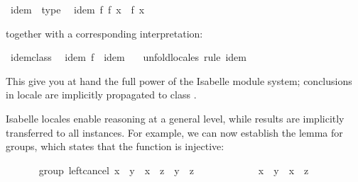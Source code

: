\begin{isabellebody}
\begin{isamarkuptext}
\end{isamarkuptext}%
\isamarkuptrue%
\isamarkupfalse%
\ idem\ {\isacharless}\ type\isanewline
\ \ idem{\isacharcolon}\ {\isachardoublequoteopen}f\ {\isacharparenleft}f\ x{\isacharparenright}\ {\isacharequal}\ f\ x{\isachardoublequoteclose}%
\begin{isamarkuptext}%
\noindent together with a corresponding interpretation:%
\end{isamarkuptext}%
\isamarkuptrue%
\isamarkupfalse%
\ idem{\isacharunderscore}class{\isacharcolon}\isanewline
\ \ idem\ {\isacharbrackleft}{\isachardoublequoteopen}f\ {\isasymColon}\ {\isacharparenleft}{\isasymalpha}{\isasymColon}idem{\isacharparenright}\ {\isasymRightarrow}\ {\isasymalpha}{\isachardoublequoteclose}{\isacharbrackright}\isanewline
%
\isadelimproof
%
\endisadelimproof
%
\isatagproof
{}\isamarkupfalse%
\ unfold{\isacharunderscore}locales\ {\isacharparenleft}rule\ idem{\isacharparenright}%
\endisatagproof
{\isafoldproof}%
%
\isadelimproof
%
\endisadelimproof
%
\isadelimML
%
\endisadelimML
%
\isatagML
%
\endisatagML
{\isafoldML}%
%
\isadelimML
%
\endisadelimML
%
\begin{isamarkuptext}%
This give you at hand the full power of the Isabelle module system;
  conclusions in locale  are implicitly propagated
  to class .%
\end{isamarkuptext}%
\isamarkuptrue%
%
\isamarkuptrue%
%
\begin{isamarkuptext}%
Isabelle locales enable reasoning at a general level, while results
  are implicitly transferred to all instances.  For example, we can
  now establish the  lemma for groups, which
  states that the function  is injective:%
\end{isamarkuptext}%
\isamarkuptrue%
\ \ \ \ \isamarkupfalse%
\ {\isacharparenleft}\ group{\isacharparenright}\ left{\isacharunderscore}cancel{\isacharcolon}\ {\isachardoublequoteopen}x\ {\isasymotimes}\ y\ {\isacharequal}\ x\ {\isasymotimes}\ z\ {\isasymlongleftrightarrow}\ y\ {\isacharequal}\ z{\isachardoublequoteclose}\isanewline
%
\isadelimproof
\ \ \ \ %
\endisadelimproof
%
\isatagproof
{}\isamarkupfalse%
\isanewline
\ \ \ \ \ \ \isamarkupfalse%
\ {\isachardoublequoteopen}x\ {\isasymotimes}\ y\ {\isacharequal}\ x\ {\isasymotimes}\ z{\isachardoublequoteclose}\isanewline

\end{isabellebody}
